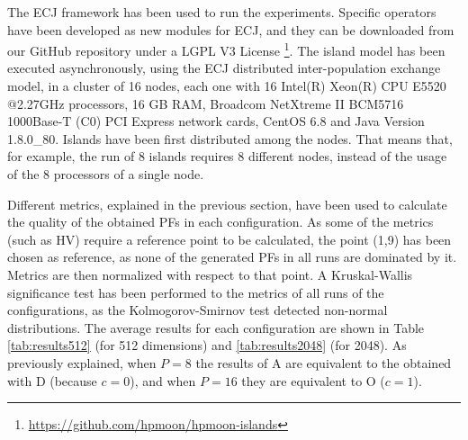 \documentclass[preprint]{elsarticle}
\begin{document}
The ECJ framework \citep{ECJ} has been used to run the
experiments. Specific operators have been developed as new modules for
ECJ, and they can be downloaded from our GitHub repository under a
LGPL V3 License
\footnote{\url{https://github.com/hpmoon/hpmoon-islands}}. 
The
island model has been executed asynchronously, using the ECJ distributed inter-population exchange
 model, in a cluster of 16 nodes, each one with 16 Intel(R) Xeon(R) CPU E5520
@2.27GHz processors, 16 GB RAM, Broadcom NetXtreme II BCM5716 1000Base-T (C0) PCI Express network cards, CentOS 6.8 and Java Version 1.8.0\_80. Islands have been first distributed among the nodes. That means that, for example, the run of 8 islands requires 8 different nodes, instead of the usage of the 8 processors of a single node.


Different metrics, explained in the previous section, have been used
to calculate the quality of the obtained PFs in each configuration. As
some of the metrics  (such as HV) require a reference point to be
calculated, the point (1,9) has been chosen as reference, as none of
the generated PFs in all runs are dominated by it. Metrics are then
normalized with respect to that point. A Kruskal-Wallis significance
test has been performed to the metrics of all runs of the
configurations, as the Kolmogorov-Smirnov test detected non-normal
distributions. The average results for each configuration are shown in
Table \ref{tab:results512} (for 512 dimensions) and
\ref{tab:results2048} (for 2048). As previously explained, when $P=8$
the results of A are equivalent to the obtained with D (because
$c=0$), and when $P=16$ they are equivalent to O ($c=1$). 
\end{document}
